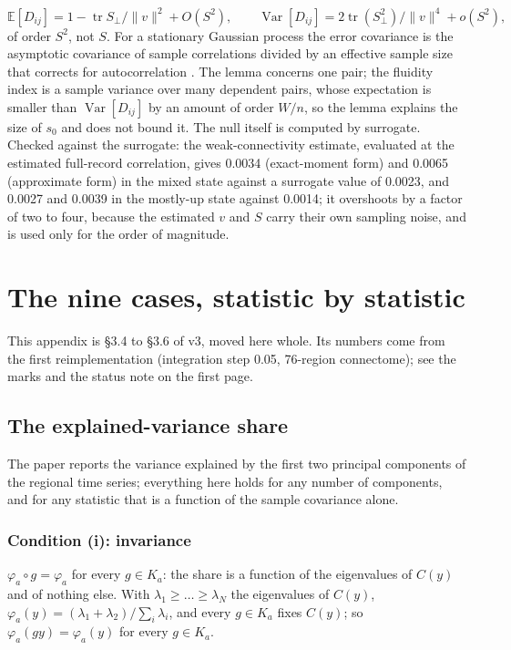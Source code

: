 \documentclass[11pt]{article}
\newenvironment{newtext}{\par\color{teal!55!black}}{\par}
\begin{document}
\[
\mathbb{E}[D_{ij}]=1-\operatorname{tr}S_\perp/\|v\|^{2}+O(S^{2}),\qquad \operatorname{Var}[D_{ij}]=2\operatorname{tr}(S_\perp^{2})/\|v\|^{4}+o(S^{2}),
\]
of order $S^{2}$, not $S$. For a stationary Gaussian process the error covariance is the asymptotic covariance of sample correlations \parencite{steiger1980} divided by an effective sample size that corrects for autocorrelation \parencite{bartlett1935}. The lemma concerns one pair; the fluidity index is a sample variance over many dependent pairs, whose expectation is smaller than $\operatorname{Var}[D_{ij}]$ by an amount of order $W/n$, so the lemma explains the size of $s_0$ and does not bound it. The null itself is computed by surrogate. Checked against the surrogate: the weak-connectivity estimate, evaluated at the estimated full-record correlation, gives 0.0034 (exact-moment form) and 0.0065 (approximate form) in the mixed state against a surrogate value of 0.0023, and 0.0027 and 0.0039 in the mostly-up state against 0.0014; it overshoots by a factor of two to four, because the estimated $v$ and $S$ carry their own sampling noise, and is used only for the order of magnitude.


\section{The nine cases, statistic by statistic}\label{app:cases}
\begin{newtext}
This appendix is \S3.4 to \S3.6 of v3, moved here whole. Its numbers come from the first reimplementation (integration step 0.05, 76-region connectome); see the marks and the status note on the first page.
\end{newtext}

\subsection{The explained-variance share}\label{app:share}
The paper reports the variance explained by the first two principal components of the regional time series; everything here holds for any number of components, and for any statistic that is a function of the sample covariance alone.

\subsubsection{Condition (i): invariance}
$\varphi_a\circ g=\varphi_a$ for every $g\in K_a$: the share is a function of the eigenvalues of $C(y)$ and of nothing else. With $\lambda_1\ge\dots\ge\lambda_N$ the eigenvalues of $C(y)$, $\varphi_a(y)=(\lambda_1+\lambda_2)/\sum_i\lambda_i$, and every $g\in K_a$ fixes $C(y)$; so $\varphi_a(gy)=\varphi_a(y)$ for every $g\in K_a$.
\end{document}
